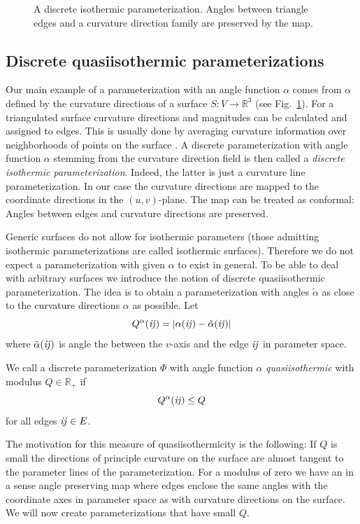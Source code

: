 \begin{figure}
\centering

\caption{A discrete isothermic parameterization. Angles between triangle edges 
and a curvature direction family are preserved by the map.}
\label{fig:isothermic_parameterization}
\end{figure}

\subsection{Discrete quasiisothermic parameterizations}
Our main example of a parameterization with an angle function $\alpha$ comes
from $\alpha$ defined by the curvature directions of a surface $S:V\to
\mathbb R^3$ (see Fig.~\ref{fig:isothermic_parameterization}). For a triangulated surface 
curvature directions and magnitudes can be calculated and assigned to edges. This 
is usually done by averaging curvature information over neighborhoods of points 
on the surface \cite{CohMor03}. A discrete parameterization 
with angle function $\alpha$ stemming from the curvature direction field is then called a
\emph{discrete isothermic parameterization}. Indeed, the latter is just a
curvature line parameterization. In our case the curvature directions
are mapped to the coordinate directions in the $(u,v)$-plane. The map can be
treated as conformal: Angles between edges and curvature directions are 
preserved.

Generic surfaces do not allow for isothermic parameters (those admitting
isothermic parameterizations are called isothermic surfaces). Therefore we do
not expect a parameterization with given $\alpha$ to exist in general. To be
able to deal with arbitrary surfaces we introduce the notion of discrete
quasiisothermic parameterization. The idea is to obtain a parameterization with
angles $\tilde\alpha$ as close to the curvature directions $\alpha$ as possible.
Let
\begin{equation}
Q^\alpha(\mathrm{\it{ij}})=\left|\alpha(\mathrm{\it{ij}}) - \tilde\alpha(\mathrm{\it{ij}})\right|
\label{eq:quasiisothermicity}
\end{equation}
where $\tilde\alpha(\mathrm{\it{ij}})$ is angle the between the $v$-axis and the edge $\mathrm{\it{ij}}$ in 
parameter space.
\begin{definition}
We call a discrete parameterization $\Phi$ with angle function $\alpha$ 
\emph{quasiisothermic} with modulus $Q\in \mathbb R_+$ if
\begin{equation}
Q^\alpha(\mathrm{\it{ij}}) \leq Q
\end{equation}
for all edges $\mathrm{\it{ij}}\in E$.
\end{definition}
The motivation for this measure of quasiisothermicity is the following: If $Q$ is small
the directions of principle curvature on the surface are almost tangent to the parameter 
lines of the parameterization. For a modulus of zero we have an in a sense angle 
preserving map where edges enclose the same angles with the coordinate axes in 
parameter space as with curvature directions on the surface. We will now 
create parameterizations that have small $Q$.


